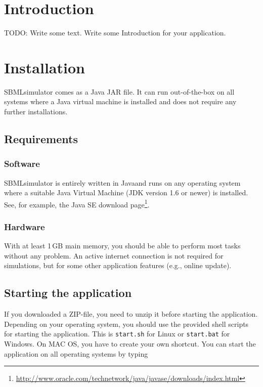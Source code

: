 \chapter{Introduction}

TODO: Write some text. Write some Introduction for your application.


\chapter{Installation}
SBMLsimulator comes as a Java JAR file. It can run out-of-the-box on all systems where a Java virtual machine is installed and does not require any further installations.


\section{Requirements}
\subsection{Software}

SBMLsimulator is entirely written in Java\TTra and runs on any operating system
where a suitable Java Virtual Machine (JDK version 1.6 or newer) is installed.
See, for example, the Java SE download
page\footnote{\url{http://www.oracle.com/technetwork/java/javase/downloads/index.html}\label{fn:jvmldl}}.

\subsection{Hardware}

With at least 1\,GB main memory, you should be able to perform most tasks
without any problem. An active internet connection is not required for simulations, but for some other application features (e.g., online update).

\section{Starting the application}
\label{startingTheProgram}

If you downloaded a ZIP-file, you need to unzip it before starting the
application. Depending on your operating system, you should use the provided
shell scripts for starting the application. This is \texttt{start.sh} for Linux
or \texttt{start.bat} for Windows. On MAC OS, you have to create your own
shortcut. You can start the application on all operating systems by typing

